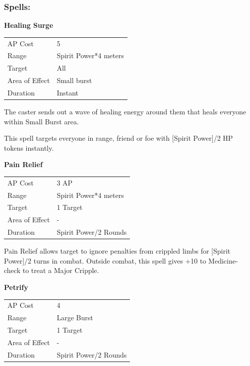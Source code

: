 \documentclass[11pt,a4paper,twocolumn]{book}
\begin{document}
\subsubsection*{Spells:}

\smallskip
\noindent
\textbf{Healing Surge}

\smallskip
{
	\begin{tabu} to 70mm{| X[l,4] | X[l,7] |}
		\hline
        AP Cost	      	& 5 						\\
        Range     		& Spirit Power*4 meters		\\
        Target      	& All						\\
        Area of Effect  & Small burst  	 			\\
        Duration     	& Instant					\\ \hline
	\end{tabu}
		
}
\smallskip

The caster sends out a wave of healing energy around them that heals everyone within Small Burst area. 

This spell targets everyone in range, friend or foe with [Spirit Power]/2 HP tokens instantly.

\bigskip
\noindent
\textbf{Pain Relief}

\smallskip
{
	\begin{tabu} to 70mm{| X[l,4] | X[l,7] |}
		\hline
        AP Cost	      	& 3 AP 						\\
        Range     		& Spirit Power*4 meters				\\
        Target      	& 1 Target		\\
        Area of Effect  & -  	 			\\
        Duration     	& Spirit Power/2 Rounds		\\ \hline
	\end{tabu}
		
}
\smallskip

Pain Relief allows target to ignore penalties from crippled limbs for [Spirit Power]/2 turns in combat. Outside combat, this spell gives +10 to Medicine-check to treat a Major Cripple.


\bigskip
\noindent
\textbf{Petrify}

\smallskip
{
	\begin{tabu} to 70mm{| X[l,4] | X[l,7] |}
		\hline
        AP Cost	      	& 4 						\\
        Range     		& Large Burst				\\
        Target      	& 1 Target		\\
        Area of Effect  & -  	 			\\
        Duration     	& Spirit Power/2 Rounds		\\ \hline
	\end{tabu}
		
}
\smallskip
\end{document}
